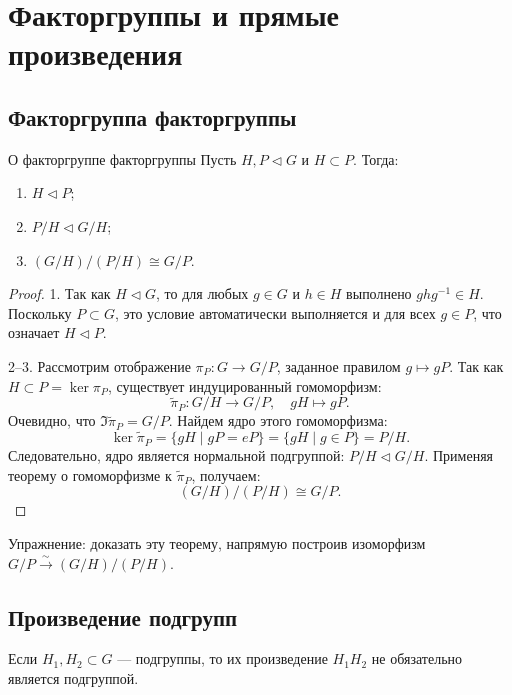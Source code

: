
\section{Факторгруппы и прямые произведения}

\subsection{Факторгруппа факторгруппы}

\begin{Theorem}{О факторгруппе факторгруппы}{}
	Пусть $H, P \triangleleft G$ и $H \subset P$. Тогда:
	\begin{enumerate}
		\item $H \triangleleft P$;
		\item $P/H \triangleleft G/H$;
		\item $(G/H)/(P/H) \cong G/P$.
	\end{enumerate}
\end{Theorem}

\begin{proof}
	1. Так как $H \triangleleft G$, то для любых $g \in G$ и $h \in H$ выполнено $ghg^{-1} \in H$. Поскольку $P \subset G$, это условие автоматически выполняется и для всех $g \in P$, что означает $H \triangleleft P$.
	
	2--3. Рассмотрим отображение $\pi_P \colon G \to G/P$, заданное правилом $g \mapsto gP$.
	Так как $H \subset P = \ker \pi_P$, существует индуцированный гомоморфизм:
	\[
	\widetilde{\pi}_P \colon G/H \to G/P, \quad gH \mapsto gP.
	\]
	Очевидно, что $\Im \widetilde{\pi}_P = G/P$. Найдем ядро этого гомоморфизма:
	\[
	\ker \widetilde{\pi}_P = \{ gH \mid gP = eP \} = \{ gH \mid g \in P \} = P/H.
	\]
	Следовательно, ядро является нормальной подгруппой: $P/H \triangleleft G/H$.
	Применяя теорему о гомоморфизме к $\widetilde{\pi}_P$, получаем:
	\[
	(G/H)/(P/H) \cong G/P.
	\]
\end{proof}

\begin{Remark}{}{}
	Упражнение: доказать эту теорему, напрямую построив изоморфизм $G/P \xrightarrow{\sim} (G/H)/(P/H)$.
\end{Remark}

\subsection{Произведение подгрупп}

\begin{Remark}{}{}
	Если $H_1, H_2 \subset G$ --- подгруппы, то их произведение $H_1H_2$ не обязательно является подгруппой.
\end{Remark}

